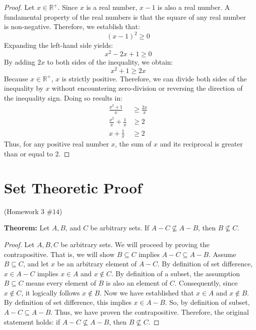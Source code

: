 \documentclass[12pt]{amsart}
\begin{document}
\begin{proof}
Let $x \in \mathbb{R}^+$. Since $x$ is a real number, $x-1$ is also a real number. A fundamental property of the real numbers is that the square of any real number is non-negative. Therefore, we establish that:
\[
    (x-1)^2 \ge 0
\]
Expanding the left-hand side yields:
\[
    x^2 - 2x + 1 \ge 0
\]
By adding $2x$ to both sides of the inequality, we obtain:
\[
    x^2 + 1 \ge 2x
\]
Because $x \in \mathbb{R}^+$, $x$ is strictly positive. Therefore, we can divide both sides of the inequality by $x$ without encountering zero-division or reversing the direction of the inequality sign. Doing so results in:
\begin{align*}
    \frac{x^2 + 1}{x} &\ge \frac{2x}{x} \\
    \frac{x^2}{x} + \frac{1}{x} &\ge 2 \\
    x + \frac{1}{x} &\ge 2
\end{align*}
Thus, for any positive real number $x$, the sum of $x$ and its reciprocal is greater than or equal to $2$.
\end{proof}


\newpage

\section{Set Theoretic Proof}
{\begin{center}(Homework 3 $\#14$)\end{center}}
\textbf{Theorem:}{ Let $A, B$, and $C$ be arbitrary sets. If $A-C \nsubseteq A-B$, then $B \nsubseteq C$.}
\begin{proof}
Let $A, B, C$ be arbitrary sets. We will proceed by proving the contrapositive. That is, we will show $B \subseteq C$ implies $A-C \subseteq A-B$. Assume $B \subseteq C$, and let $x$ be an arbitrary element of $A - C$. By definition of set difference, $x \in A - C$ implies $x \in A$ and $x \not \in C$. By definition of a subset, the assumption $B \subseteq C$ means every element of $B$ is also an element of $C$. Consequently, since $x \notin C$, it logically follows $x \notin B$.
Now we have established that $x \in A$ and $x \notin B$. By definition of set difference, this implies $x \in A - B$. So, by definition of subset, $A - C \subseteq A - B$. Thus, we have proven the contrapositive. Therefore, the original statement holds: if $A - C \not\subseteq A - B$, then $ B \not\subseteq C$.
\end{proof}
\end{document}
